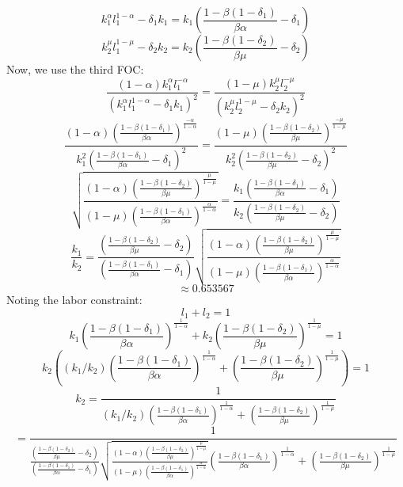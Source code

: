 \documentclass[10pt,letter]{article}
\begin{document}
\[ k_1^\alpha l_1^{1-\alpha} - \delta_1 k_1 = k_1 \left( \frac{1 - \beta (1-\delta_1)}{\beta \alpha}  - \delta_1\right) \]
\[ k_2^\mu l_1^{1-\mu} - \delta_2 k_2 = k_2 \left( \frac{1 -\beta (1-\delta_2)}{\beta \mu} - \delta_2 \right) \]
Now, we use the third FOC:
\[ \frac{(1-\alpha) k_1^\alpha l_1^{-\alpha}}{( k_1^\alpha l_1^{1-\alpha} - \delta_1 k_1 )^2} = \frac{(1-\mu) k_2^\mu l_2^{-\mu}}{( k_2^\mu l_2^{1-\mu} -\delta_2 k_2 )^2} \]
\[ \frac{(1-\alpha) \left( \frac{1 - \beta (1-\delta_1)}{\beta \alpha} \right)^{\frac{-\alpha}{1-\alpha}}}{k_1^2 \left( \frac{1 - \beta (1-\delta_1)}{\beta \alpha}  - \delta_1\right)^2} = \frac{(1-\mu) \left( \frac{1 -\beta (1-\delta_2)}{\beta \mu} \right)^{\frac{-\mu}{1-\mu}}}{k_2^2 \left( \frac{1 -\beta (1-\delta_2)}{\beta \mu} - \delta_2 \right)^2} \]
\[ \sqrt{\frac{(1-\alpha)  \left( \frac{1 -\beta (1-\delta_2)}{\beta \mu} \right)^{\frac{\mu}{1-\mu}}}{(1-\mu)\left( \frac{1 - \beta (1-\delta_1)}{\beta \alpha} \right)^{\frac{\alpha}{1-\alpha}}}} = \frac{k_1 \left( \frac{1 - \beta (1-\delta_1)}{\beta \alpha}  - \delta_1\right)}{k_2 \left( \frac{1 -\beta (1-\delta_2)}{\beta \mu} - \delta_2 \right)} \]
\[ \frac{k_1 }{k_2 } = \frac{\left( \frac{1 -\beta (1-\delta_2)}{\beta \mu} - \delta_2 \right)}{\left( \frac{1 - \beta (1-\delta_1)}{\beta \alpha}  - \delta_1\right)}\sqrt{\frac{(1-\alpha)  \left( \frac{1 -\beta (1-\delta_2)}{\beta \mu} \right)^{\frac{\mu}{1-\mu}}}{(1-\mu)\left( \frac{1 - \beta (1-\delta_1)}{\beta \alpha} \right)^{\frac{\alpha}{1-\alpha}}}}  \]
\[ \approx 0.653567 \]
Noting the labor constraint:
\[ l_1 + l_2 = 1 \]
\[ k_1 \left( \frac{1 - \beta (1-\delta_1)}{\beta \alpha} \right)^{\frac{1}{1-\alpha}} +k_2 \left( \frac{1 -\beta (1-\delta_2)}{\beta \mu} \right)^{\frac{1}{1-\mu}} = 1 \]
\[ k_2 \left((k_1/k_2)\left( \frac{1 - \beta (1-\delta_1)}{\beta \alpha} \right)^{\frac{1}{1-\alpha}} + \left( \frac{1 -\beta (1-\delta_2)}{\beta \mu} \right)^{\frac{1}{1-\mu}}\right) = 1\]
\[ k_2 = \frac{1}{(k_1/k_2)\left( \frac{1 - \beta (1-\delta_1)}{\beta \alpha} \right)^{\frac{1}{1-\alpha}} + \left( \frac{1 -\beta (1-\delta_2)}{\beta \mu} \right)^{\frac{1}{1-\mu}}}\]
\[ = \frac{1}{\frac{\left( \frac{1 -\beta (1-\delta_2)}{\beta \mu} - \delta_2 \right)}{\left( \frac{1 - \beta (1-\delta_1)}{\beta \alpha}  - \delta_1\right)}\sqrt{\frac{(1-\alpha)  \left( \frac{1 -\beta (1-\delta_2)}{\beta \mu} \right)^{\frac{\mu}{1-\mu}}}{(1-\mu)\left( \frac{1 - \beta (1-\delta_1)}{\beta \alpha} \right)^{\frac{\alpha}{1-\alpha}}}} \left( \frac{1 - \beta (1-\delta_1)}{\beta \alpha} \right)^{\frac{1}{1-\alpha}} + \left( \frac{1 -\beta (1-\delta_2)}{\beta \mu} \right)^{\frac{1}{1-\mu}}} \]
\end{document}
